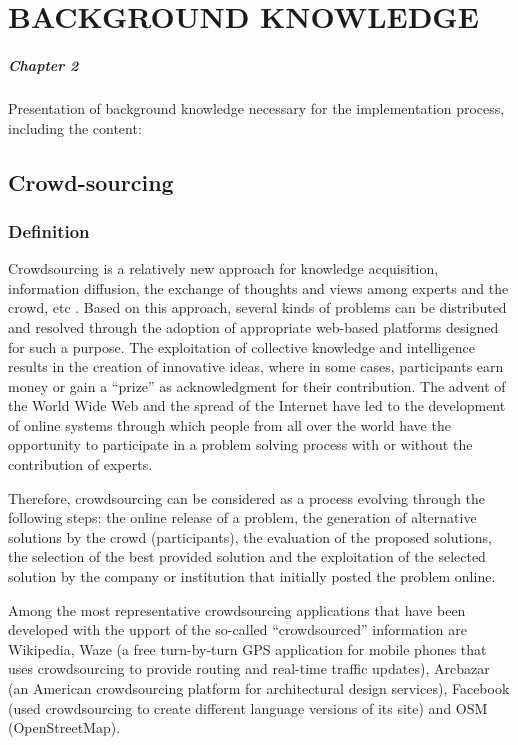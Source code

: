 \chapter{BACKGROUND KNOWLEDGE}
\label{chap:background}

\paragraph{Chapter 2} Presentation of background knowledge necessary for the implementation process, including the content:

\section{Crowd-sourcing}
\subsection{Definition}
Crowdsourcing is a relatively new approach for knowledge acquisition, information diffusion, the exchange of thoughts and views among experts and the crowd, etc \cite{futureinternet0600109}. Based on this approach, several kinds of problems can be distributed and resolved through the adoption of appropriate web-based platforms designed for such a purpose. The exploitation of collective knowledge and intelligence results in the creation of innovative ideas, where in some cases, participants earn money or gain a “prize” as acknowledgment for their contribution. The advent of the World Wide Web and the spread of the Internet have led to the development of online systems through which people from all over the world have the opportunity to participate in a problem solving process with or without the contribution of experts. 

Therefore, crowdsourcing can be considered as a process evolving through the following steps: the online release of a problem, the generation of alternative solutions by the crowd (participants), the evaluation of the proposed solutions, the selection of the best provided solution and the exploitation of the selected solution by the company or institution that initially posted the problem online.

 Among the most representative crowdsourcing applications that have been developed with the upport of the so-called “crowdsourced” information are Wikipedia, Waze (a free turn-by-turn GPS application for mobile phones that uses crowdsourcing to provide routing and real-time traffic updates), Arcbazar (an American crowdsourcing platform for architectural design services), Facebook (used crowdsourcing to create different language versions of its site) and OSM (OpenStreetMap).
 

